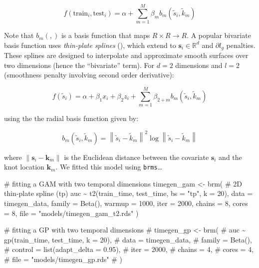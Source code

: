 \documentclass[
  doc,
  floatsintext,
  longtable,
  a4paper,
  nolmodern,
  notxfonts,
  notimes,
  colorlinks=true,linkcolor=blue,citecolor=blue,urlcolor=blue]{apa7}
\newenvironment{Shaded}{\begin{snugshade}}{\end{snugshade}}
\newcommand{\AttributeTok}[1]{\textcolor[rgb]{0.40,0.45,0.13}{#1}}
\newcommand{\CommentTok}[1]{\textcolor[rgb]{0.37,0.37,0.37}{#1}}
\newcommand{\DecValTok}[1]{\textcolor[rgb]{0.68,0.00,0.00}{#1}}
\newcommand{\FunctionTok}[1]{\textcolor[rgb]{0.28,0.35,0.67}{#1}}
\newcommand{\NormalTok}[1]{\textcolor[rgb]{0.00,0.23,0.31}{#1}}
\newcommand{\OtherTok}[1]{\textcolor[rgb]{0.00,0.23,0.31}{#1}}
\newcommand{\SpecialCharTok}[1]{\textcolor[rgb]{0.37,0.37,0.37}{#1}}
\newcommand{\StringTok}[1]{\textcolor[rgb]{0.13,0.47,0.30}{#1}}
\begin{document}
\[
f \left(\text{train}_{i}, \text{test}_{i} \right) = \alpha + \sum_{m=1}^M \beta_{m} b_{m} \left(\tilde{s}_{i}, \tilde{k}_{m} \right)
\]

Note that \(b_{m}(,)\) is a basis function that maps
\(R \times R \rightarrow R\). A popular bivariate basis function uses
\emph{thin-plate splines} (), which
extend to \(\mathbf{s}_{i} \in \mathbb{R}^{d}\) and \(\partial l_{g}\)
penalties. These splines are designed to interpolate and approximate
smooth surfaces over two dimensions (hence the ``bivariate'' term). For
\(d=2\) dimensions and \(l=2\) (smoothness penalty involving second
order derivative):

\[
f \left(\tilde{s}_{i} \right) = \alpha + \beta_{1} x_{i} + \beta_{2} z_{i} +\sum_{m=1}^{M} \beta_{2+m} b_m\left(\tilde{s}_i, \tilde{k}_m\right)
\]

using the the radial basis function given by:

\[
b_m\left(\tilde{s}_i, \tilde{k}_m\right)=\left\|\tilde{s}_i-\tilde{k}_m\right\|^2 \log \left\|\tilde{s}_i-\tilde{k}_m\right\|
\]

where \(\left\|\mathbf{s}_i-\mathbf{k}_{m}\right\|\) is the Euclidean
distance between the covariate \(\mathbf{s}_{i}\) and the knot location
\(\mathbf{k}_{m}\). We fitted this model using \texttt{brms}\ldots{}

\begin{Shaded}
\begin{Highlighting}[]
\CommentTok{\# fitting a GAM with two temporal dimensions}
\NormalTok{timegen\_gam }\OtherTok{\textless{}{-}} \FunctionTok{brm}\NormalTok{(}
    \CommentTok{\# 2D thin{-}plate spline (tp)}
\NormalTok{    auc }\SpecialCharTok{\textasciitilde{}} \FunctionTok{t2}\NormalTok{(train\_time, test\_time, }\AttributeTok{bs =} \StringTok{"tp"}\NormalTok{, }\AttributeTok{k =} \DecValTok{20}\NormalTok{),}
    \AttributeTok{data =}\NormalTok{ timegen\_data,}
    \AttributeTok{family =} \FunctionTok{Beta}\NormalTok{(),}
    \AttributeTok{warmup =} \DecValTok{1000}\NormalTok{,}
    \AttributeTok{iter =} \DecValTok{2000}\NormalTok{,}
    \AttributeTok{chains =} \DecValTok{8}\NormalTok{,}
    \AttributeTok{cores =} \DecValTok{8}\NormalTok{,}
    \AttributeTok{file =} \StringTok{"models/timegen\_gam\_t2.rds"}
\NormalTok{    )}

\CommentTok{\# fitting a GP with two temporal dimensions}
\CommentTok{\# timegen\_gp \textless{}{-} brm(}
\CommentTok{\#     auc \textasciitilde{} gp(train\_time, test\_time, k = 20),}
\CommentTok{\#     data = timegen\_data,}
\CommentTok{\#     family = Beta(),}
\CommentTok{\#     control = list(adapt\_delta = 0.95),}
\CommentTok{\#     iter = 2000,}
\CommentTok{\#     chains = 4,}
\CommentTok{\#     cores = 4,}
\CommentTok{\#     file = "models/timegen\_gp.rds"}
\CommentTok{\#     )}
\end{Highlighting}
\end{Shaded}
\end{document}
